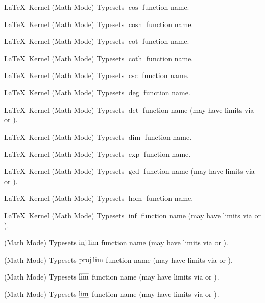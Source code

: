 %
 {}%
 {\LaTeX\ Kernel (Math Mode)}%
 {Typesets \ensuremath{\cos} function name.}%
 {}

%
 {}%
 {\LaTeX\ Kernel (Math Mode)}%
 {Typesets \ensuremath{\cosh} function name.}%
 {}

%
 {}%
 {\LaTeX\ Kernel (Math Mode)}%
 {Typesets \ensuremath{\cot} function name.}%
 {}

%
 {}%
 {\LaTeX\ Kernel (Math Mode)}%
 {Typesets \ensuremath{\coth} function name.}%
 {}

%
 {}%
 {\LaTeX\ Kernel (Math Mode)}%
 {Typesets \ensuremath{\csc} function name.}%
 {}

%
 {}%
 {\LaTeX\ Kernel (Math Mode)}%
 {Typesets \ensuremath{\deg} function name.}%
 {}

%
 {}%
 {\LaTeX\ Kernel (Math Mode)}%
 {Typesets \ensuremath{\det} function name (may have limits via  or ).}%
 {}

%
 {}%
 {\LaTeX\ Kernel (Math Mode)}%
 {Typesets \ensuremath{\dim} function name.}%
 {}

%
 {}%
 {\LaTeX\ Kernel (Math Mode)}%
 {Typesets \ensuremath{\exp} function name.}%
 {}

%
 {}%
 {\LaTeX\ Kernel (Math Mode)}%
 {Typesets \ensuremath{\gcd} function name (may have limits via  or ).}%
 {}

%
 {}%
 {\LaTeX\ Kernel (Math Mode)}%
 {Typesets \ensuremath{\hom} function name.}%
 {}

%
 {}%
 {\LaTeX\ Kernel (Math Mode)}%
 {Typesets \ensuremath{\inf} function name (may have limits via  or ).}%
 {}

%
 {}%
 { (Math Mode)}%
 {Typesets \ensuremath{\injlim} function name (may have limits via  or ).}%
 {}

%
 {}%
 { (Math Mode)}%
 {Typesets \ensuremath{\projlim} function name (may have limits via  or ).}%
 {}

%
 {}%
 { (Math Mode)}%
 {Typesets \ensuremath{\varlimsup} function name (may have limits via  or ).}%
 {}

%
 {}%
 { (Math Mode)}%
 {Typesets \ensuremath{\varliminf} function name (may have limits via  or ).}%
 {}

